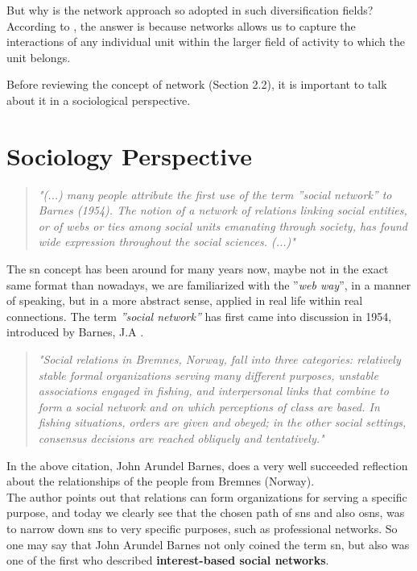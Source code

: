 \indent But why is the network approach so adopted in such diversification fields? According to \citep{kilduff2003social}, the answer is because networks allows us to capture the interactions of any individual unit within the larger field of activity to which the unit belongs.

\indent Before reviewing the concept of network (Section 2.2), it is important to talk about it in a sociological perspective.


\section{Sociology Perspective}
\begin{quote}
\textit{"(...) many people attribute the first use of the term ''social network'' to
Barnes (1954). The notion of a network of relations linking social entities, or of webs or ties among social units emanating through society, has
found wide expression throughout the social sciences. (...)"}
\citep{wasserman1994social}
\end{quote}

The \gls{sn} concept has been around for many years now, maybe not in the exact same format than nowadays, we are familiarized with the ''\textit{web way}'', in a manner of speaking, but in a more abstract sense, applied in real life within real connections.
The term \textit{''social network''} has first came into discussion in 1954, introduced by Barnes, J.A \citep{wasserman1994social}.

\begin{quote}
\textit{"Social relations in Bremnes, Norway, fall into three categories: relatively stable formal organizations serving many different
purposes, unstable associations engaged in fishing, and interpersonal links that combine to form a social
network and on which perceptions of class are based. In fishing situations, orders are given and
obeyed; in the other social settings, consensus decisions are reached obliquely and tentatively."}
\citep{barnes1954class}
\end{quote}

In the above citation, John Arundel Barnes, does a very well succeeded reflection about the relationships of the people from Bremnes (Norway).\\
\indent The author points out that relations can form organizations for serving a specific purpose, and today we clearly see that the chosen path of
\glspl{sn} and also \glspl{osn}, was to narrow down \glspl{sn} to very specific purposes, such as professional networks. So one may say that John
Arundel Barnes not only coined the term \gls{sn}, but also was one of the first who described \textbf{interest-based social networks}.\\


